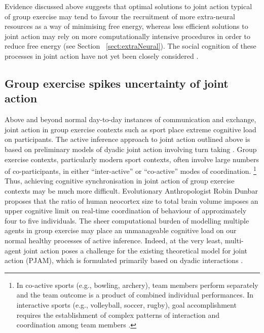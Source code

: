 \begin{CJK}{UTF8}{gbsn}
Evidence discussed above suggests that optimal solutions to joint action typical of group exercise may tend to favour the recruitment of more extra-neural resources as a way of minimising free energy, whereas less efficient solutions to joint action may rely on more computationally intensive procedures in order to reduce free energy (see Section ~\ref{sect:extraNeural}).  The social cognition of these processes in joint action have not yet been closely considered \citep[but see ][]{Marsh2009,Lumsden2012}.




    \subsection{Group exercise spikes uncertainty of joint action}


    Above and beyond normal day-to-day instances of communication and exchange, joint action in group exercise contexts such as sport place extreme cognitive load on participants. The active inference approach to joint action outlined above is based on preliminary models of dyadic joint action involving turn taking \citep[i.e., in bird song exchanges][]{Friston2015}.  Group exercise contexts, particularly modern sport contexts, often involve large numbers of co-participants, in either ``inter-active'' or ``co-active'' modes of coordination.
        \footnote{
        In co-active sports (e.g., bowling, archery), team members perform separately and the team outcome is a product of combined individual performances. In interactive sports (e.g., volleyball, soccer, rugby), goal accomplishment requires the establishment of complex patterns of interaction and coordination among team members \citep{Filho2014}.
        }
    Thus, achieving cognitive synchronisation in joint action of group exercise contexts may be much more difficult.  Evolutionary Anthropologist Robin Dunbar \textcite{Dunbar1992} proposes that the ratio of human neocortex size to total brain volume imposes an upper cognitive limit on real-time coordination of behaviour of approximately four to five individuals.  The sheer computational burden of modelling multiple agents in group exercise may place an unmanageable cognitive load on our normal healthy processes of active inference.  Indeed, at the very least, multi-agent joint action poses a challenge for the existing theoretical model for joint action (PJAM), which is formulated primarily based on dyadic interactions \citep{Pesquita2017}.


\end{CJK}
